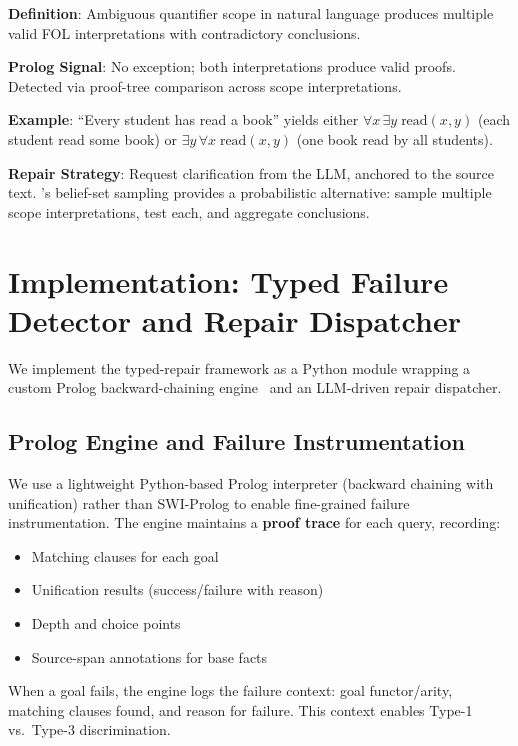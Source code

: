 \documentclass[11pt,letterpaper]{article}
\begin{document}
\textbf{Definition}: Ambiguous quantifier scope in natural language produces multiple
valid FOL interpretations with contradictory conclusions.

\textbf{Prolog Signal}: No exception; both interpretations produce valid proofs.
Detected via proof-tree comparison across scope interpretations.

\textbf{Example}: ``Every student has read a book'' yields either
$\forall x\,\exists y\;\text{read}(x,y)$ (each student read some book) or
$\exists y\,\forall x\;\text{read}(x,y)$ (one book read by all students).

\textbf{Repair Strategy}: Request clarification from the LLM, anchored to the source
text. \citet{Jung2022}'s belief-set sampling provides a probabilistic alternative:
sample multiple scope interpretations, test each, and aggregate conclusions.

\section{Implementation: Typed Failure Detector and Repair Dispatcher}
\label{sec:implementation}

We implement the typed-repair framework as a Python module wrapping a custom Prolog
backward-chaining engine~\citep{PrologPy2023} and an LLM-driven repair dispatcher.

\subsection{Prolog Engine and Failure Instrumentation}

We use a lightweight Python-based Prolog interpreter (backward chaining with
unification) rather than SWI-Prolog to enable fine-grained failure instrumentation.
The engine maintains a \textbf{proof trace} for each query, recording:
\begin{itemize}
  \item Matching clauses for each goal
  \item Unification results (success/failure with reason)
  \item Depth and choice points
  \item Source-span annotations for base facts
\end{itemize}
When a goal fails, the engine logs the failure context: goal functor/arity, matching
clauses found, and reason for failure. This context enables Type-1 vs.\ Type-3
discrimination.
\end{document}
